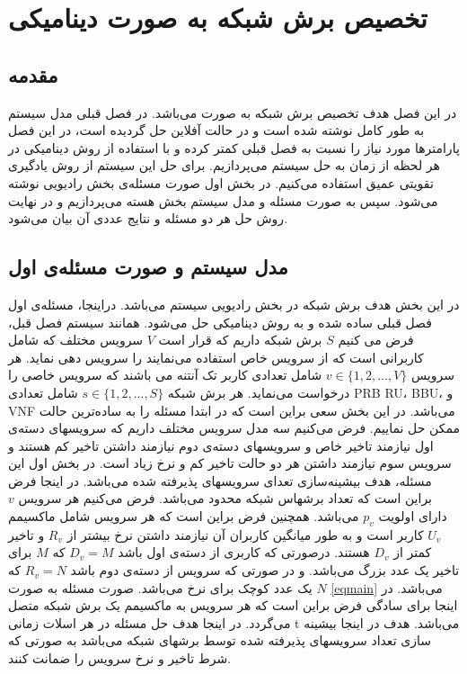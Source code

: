 \chapter{تخصیص برش شبکه به صورت دینامیکی}
\section{مقدمه}
در این فصل هدف تخصیص برش شبکه به صورت می‌باشد. در فصل قبلی مدل سیستم به طور کامل نوشته شده است و در حالت آفلاین حل گردیده است، در این فصل پارامترها مورد نیاز را نسبت به فصل قبلی کمتر کرده و با استفاده از روش دینامیکی در هر لحظه از زمان به حل سیستم می‌پردازیم. برای حل این سیستم از روش یادگیری تقویتی عمیق استفاده می‌کنیم.
در بخش اول صورت مسئله‌ی بخش رادیویی نوشته می‌شود. سپس به صورت مسئله و مدل سیستم بخش هسته می‌پردازیم و در نهایت روش حل هر دو مسئله و نتایج عددی آن بیان می‌شود.
\section{ مدل سیستم و صورت مسئله‌ی اول}
در این بخش هدف برش شبکه در بخش رادیویی سیستم می‌باشد. دراینجا، مسئله‌ی اول فصل قبلی ساده شده و به روش دینامیکی حل می‌شود.   
همانند سیستم فصل قبل، فرض می کنیم $S$ برش شبکه داریم که قرار است $V$ سرویس مختلف که شامل کاربرانی است که از سرویس خاص استفاده می‌نمایند را سرویس دهی نماید.
هر سرویس 
$v\in \{1,2,...,V \} $
شامل تعدادی کاربر تک آنتنه می باشند که سرویس خاصی را درخواست می‌نماید.
هر برش شبکه
$s\in \{1,2,...,S \} $
 شامل تعدادی
 PRB
  RU،
   BBU، 
   و
    VNF 
 می‌باشد.
در این بخش سعی برا‌ین است که در ابتدا مسئله را به ساده‌ترین حالت ممکن حل نماییم. فرض می‌کنیم سه مدل سرویس مختلف داریم که سرویسهای دسته‌ی اول نیازمند تاخیر خاص و سرویسهای دسته‌ی دوم نیازمند داشتن تاخیر کم هستند و سرویس سوم نیازمند داشتن هر دو حالت تاخیر کم و نرخ زیاد است.
در بخش اول این مسئله، هدف بیشینه‌سازی تعدای سرویسهای پذیرفته شده می‌باشد. در اینجا فرض براین است که تعداد برشهاس شبکه محدود می‌باشد. فرض می‌کنیم هر سرویس $v$ دارای اولویت $p_v$ می‌باشد. 
همچنین فرض براین است که هر سرویس شامل ماکسیمم $U_v$ کاربر است و به طور میانگین کاربران آن نیازمند داشتن نرخ بیشتر از $R_v$ و تاخیر کمتر از $D_v$ هستند. درصورتی که کاربری از دسته‌ی اول باشد 
$D_v =  M$ 
که $M$ برای تاخیر یک عدد بزرگ می‌باشد.
و در صورتی که سرویس از دسته‌ی دوم باشد 
$R_v = N $
که $N$ یک عدد کوچک برای نرخ می‌باشد.
صورت مسئله به صورت \eqref{eqmain} می‌باشد.
در اینجا برای سادگی فرض براین است که هر سرویس به ماکسیمم یک برش شبکه متصل می‌گردد. در اینجا هدف حل مسئله در هر اسلات زمانی t می‌باشد.
 هدف در اینجا بیشینه سازی تعداد سرویسهای پذیرفته شده توسط برشهای شبکه می‌باشد به صورتی که شرط تاخیر و نرخ سرویس را ضمانت کنند.
